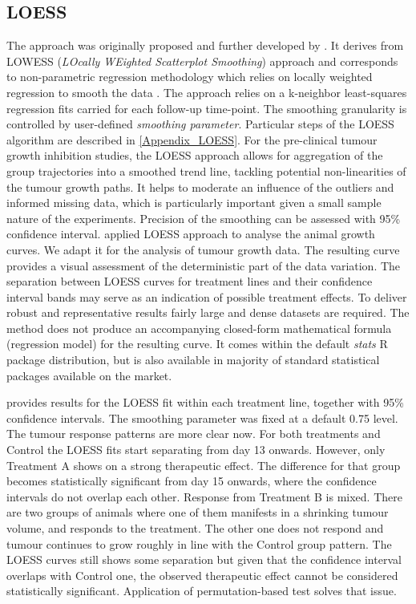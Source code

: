 \newpage
\subsection{LOESS}
The approach was originally proposed and further developed by \textcite{Cleveland:1979kf,Cleveland:1988de}.
It derives from LOWESS (\emph{LOcally WEighted Scatterplot Smoothing}) approach and corresponds to non-parametric regression methodology which relies on locally weighted regression to smooth the data \autocite{Cleveland:1981fm}.
The approach relies on a k-neighbor least-squares regression fits carried for each follow-up time-point.
The smoothing granularity is controlled by user-defined \emph{smoothing parameter}.
Particular steps of the LOESS algorithm are described in \cref{Appendix_LOESS}.
For the pre-clinical tumour growth inhibition studies, the LOESS approach allows for aggregation of the group trajectories into a smoothed trend line, tackling potential non-linearities of the tumour growth paths.
It helps to moderate an influence of the outliers and informed missing data, which is particularly important given a small sample nature of the experiments.
Precision of the smoothing can be assessed with 95\% confidence interval.
\textcite{Moses:1992dh} applied LOESS approach to analyse the animal growth curves.
We adapt it for the analysis of tumour growth data.
The resulting curve provides a visual assessment of the deterministic part of the data variation.
The separation between LOESS curves for treatment lines and their confidence interval bands may serve as an indication of possible treatment effects.
To deliver robust and representative results fairly large and dense datasets are required.
The method does not produce an accompanying closed-form mathematical formula (regression model) for the resulting curve.
It comes within the default \emph{stats} R package distribution, but is also available in majority of standard statistical packages available on the market.


 provides results for the LOESS fit within each treatment line, together with 95\% confidence intervals.
The smoothing parameter was fixed at a default 0.75 level.
The tumour response patterns are more clear now.
For both treatments and Control the LOESS fits start separating from day 13 onwards.
However, only Treatment A shows on a strong therapeutic effect.
The difference for that group becomes statistically significant from day 15 onwards, where the confidence intervals do not overlap each other.
Response from Treatment B is mixed.
There are two groups of animals where one of them manifests in a shrinking tumour volume, and responds to the treatment.
The other one does not respond and tumour continues to grow roughly in line with the Control group pattern.
The LOESS curves still shows some separation but given that the confidence interval overlaps with Control one, the observed therapeutic effect cannot be considered statistically significant.
Application of permutation-based test solves that issue.

